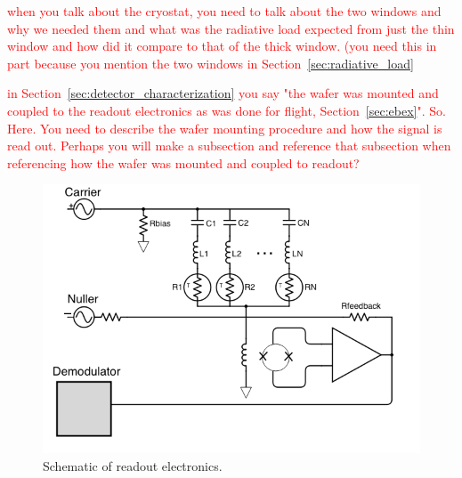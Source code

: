 
\textcolor{red}{when you talk about the cryostat, you need to talk about the two windows and why we needed them and what was the radiative load expected from just the thin window and how did it compare to that of the thick window. (you need this in part because you mention the two windows in Section~\ref{sec:radiative_load}}

\textcolor{red}{in Section~\ref{sec:detector_characterization} you say "the wafer was mounted and coupled to the readout electronics as was done for flight, Section~\ref{sec:ebex}". 
So. 
Here. You need to describe the wafer mounting procedure and how the signal is read out. 
Perhaps you will make a subsection and reference that subsection when referencing how the wafer was mounted and coupled to readout?}

\begin{figure}[htbp]
\begin{center}
\includegraphics[width=0.6\columnwidth]{figures/dfmux_schematic.png}
\caption[DFMUX schematic]{Schematic of readout electronics. 
\label{fig:dfmux} }
\end{center}
\end{figure}
 








